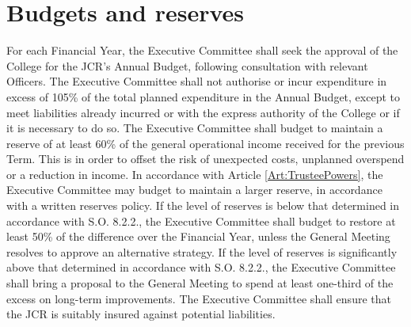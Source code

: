 \section{Budgets and reserves}
\npara For each Financial Year, the Executive Committee shall seek the approval of the College for the JCR's Annual Budget, following consultation with relevant Officers. The Executive Committee shall not authorise or incur expenditure in excess of 105\% of the total planned expenditure in the Annual Budget, except to meet liabilities already incurred or with the express authority of the College or if it is necessary to do so.
\npara The Executive Committee shall budget to maintain a reserve of at least 60\% of the general operational income received for the previous Term.  This is in order to offset the risk of unexpected costs, unplanned overspend or a reduction in income.  In accordance with Article \ref{Art:TrusteePowers}, the Executive Committee may budget to maintain a larger reserve, in accordance with a written reserves policy. 
\npara If the level of reserves is below that determined in accordance with S.O. 8.2.2., the Executive Committee shall budget to restore at least 50\% of the difference over the Financial Year, unless the General Meeting resolves to approve an alternative strategy.  If the level of reserves is significantly above that determined in accordance with S.O. 8.2.2., the Executive Committee shall bring a proposal to the General Meeting to spend at least one-third of the excess on long-term improvements.
\npara The Executive Committee shall ensure that the JCR is suitably insured against potential liabilities.

